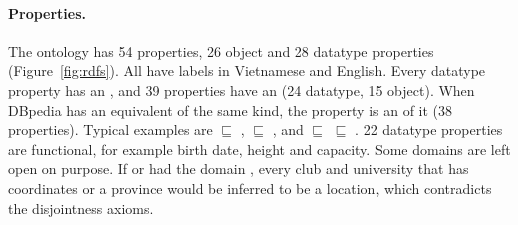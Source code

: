\paragraph{Properties.} The ontology has 54 properties, 26 object and 28
datatype properties (Figure~\ref{fig:rdfs}). All have labels in Vietnamese and
English. Every datatype property has an , and 39 properties
have an  (24 datatype, 15 object). When DBpedia has an
equivalent of the same kind, the property is an  of it
(38 properties). Typical examples are
 $\sqsubseteq$ ,
 $\sqsubseteq$ , and
 $\sqsubseteq$  $\sqsubseteq$
. 22 datatype properties are functional, for example
birth date, height and capacity. Some domains are left open on purpose. If
 or  had the domain ,
every club and university that has coordinates or a province would be
inferred to be a location, which contradicts the disjointness axioms.


